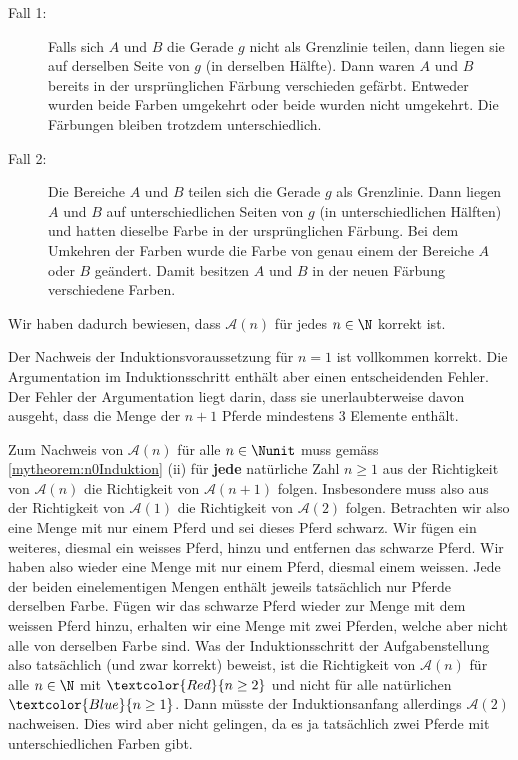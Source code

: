 \begin{myanswer}[myexercise:0207]
\begin{aenum}
\begin{renum}
\begin{enumerate}
				      \begin{description}
					      \item[Fall 1:] Falls sich $A$ und $B$ die Gerade $g$ nicht als Grenzlinie teilen, dann liegen sie auf derselben Seite von $g$ (in derselben Hälfte). Dann waren $A$ und $B$ bereits in der ursprünglichen Färbung verschieden gefärbt. Entweder wurden beide Farben umgekehrt oder beide wurden nicht umgekehrt. Die Färbungen bleiben trotzdem unterschiedlich.
					      \item[Fall 2:] Die Bereiche $A$ und $B$ teilen sich die Gerade $g$ als Grenzlinie. Dann liegen $A$ und $B$ auf unterschiedlichen Seiten von $g$ (in unterschiedlichen Hälften) und hatten dieselbe Farbe in der ursprünglichen Färbung. Bei dem Umkehren der Farben wurde die Farbe von genau einem der Bereiche $A$ oder $B$ geändert. Damit besitzen $A$ und $B$ in der neuen Färbung verschiedene Farben.
				      \end{description}
			\end{enumerate}
		\end{renum}
	\end{aenum}
	Wir haben dadurch bewiesen, dass $\mathcal{A}(n)$ für jedes $n\in\N$ korrekt ist.
\end{myanswer}

\begin{myanswer}[myexercise:0268]
	Der Nachweis der Induktionsvoraussetzung für $n=1$ ist vollkommen korrekt. Die Argumentation im Induktionsschritt enthält aber einen entscheidenden Fehler. Der Fehler der Argumentation liegt darin, dass sie unerlaubterweise davon ausgeht, dass die Menge der $n+1$ Pferde mindestens 3 Elemente enthält.

	Zum Nachweis von $\mathcal{A}(n)$ für alle $n\in\Nunit$ muss gemäss \cref{mytheorem:n0Induktion} (ii) für \textbf{jede} natürliche Zahl $n\geq 1$ aus der Richtigkeit von $\mathcal{A}(n)$ die Richtigkeit von $\mathcal{A}(n+1)$ folgen. Insbesondere muss also aus der Richtigkeit von $\mathcal{A}(1)$ die Richtigkeit von $\mathcal{A}(2)$ folgen. Betrachten wir also eine Menge mit nur einem Pferd und sei dieses Pferd schwarz. Wir fügen ein weiteres, diesmal ein weisses Pferd, hinzu und entfernen das schwarze Pferd. Wir haben also wieder eine Menge mit nur einem Pferd, diesmal einem weissen. Jede der beiden einelementigen Mengen enthält jeweils tatsächlich nur Pferde derselben Farbe. Fügen wir das schwarze Pferd wieder zur Menge mit dem weissen Pferd hinzu, erhalten wir eine Menge mit zwei Pferden, welche aber nicht alle von derselben Farbe sind. Was der Induktionsschritt der Aufgabenstellung also tatsächlich (und zwar korrekt) beweist, ist die Richtigkeit von $\mathcal{A}(n)$ für alle $n\in\N$ mit $\textcolor{Red}{n\geq 2}$ und nicht für alle natürlichen $\textcolor{Blue}{n\geq 1}$. Dann müsste der Induktionsanfang allerdings $\mathcal{A}(2)$ nachweisen. Dies wird aber nicht gelingen, da es ja tatsächlich zwei Pferde mit unterschiedlichen Farben gibt. \cite{Piotr}
\end{myanswer}

